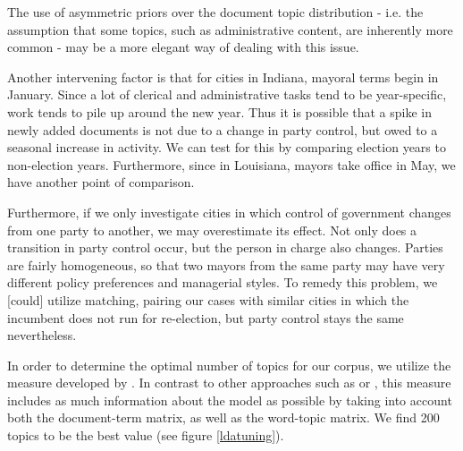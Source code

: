 \documentclass[11pt]{article}
\begin{document}
The use of asymmetric priors \citep{Wallach2009} over the document topic distribution - i.e. the assumption that some topics, such as administrative content, are inherently more common - may be a more elegant way of dealing with this issue.

Another intervening factor is that for cities in Indiana, mayoral terms begin in January. Since a lot of clerical and administrative tasks tend to be year-specific, work tends to pile up around the new year. Thus it is possible that a spike in newly added documents is not due to a change in party control, but owed to a seasonal increase in activity. We can test for this by comparing election years to non-election years. Furthermore, since in Louisiana, mayors take office in May, we have another point of comparison.

Furthermore, if we only investigate cities in which control of government changes from one party to another, we may overestimate its effect. Not only does a transition in party control occur, but the person in charge also changes. Parties are fairly homogeneous, so that two mayors from the same party may have very different policy preferences and managerial styles. To remedy this problem, we [could] utilize matching, pairing our cases with similar cities in which the incumbent does not run for re-election, but party control stays the same nevertheless.

In order to determine the optimal number of topics for our corpus, we utilize the measure developed by \cite{Arun2010}. In contrast to other approaches such as \cite{Cao2009} or \cite{Griffith2004}, this measure includes as much information about the model as possible by taking into account both the document-term matrix, as well as the word-topic matrix. We find 200 topics to be the best value (see figure \ref{ldatuning}).



\end{document}
